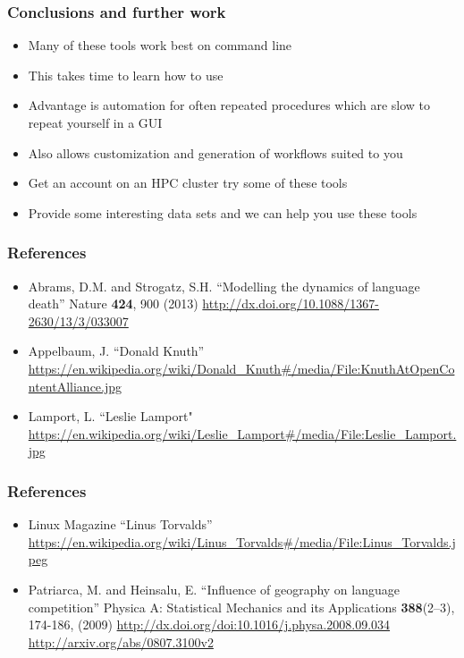 \documentclass{beamer}
\begin{document}
\begin{frame}
\frametitle{Conclusions and further work}
\begin{itemize}
\item Many of these tools work best on command line
\item This takes time to learn how to use
\item Advantage is automation for often repeated procedures which are slow to repeat yourself in a GUI
\item Also allows customization and generation of workflows suited to you
\item Get an account on an HPC cluster try some of these tools
\item Provide some interesting data sets and we can help you use these tools
\end{itemize}
\end{frame}

\begin{frame}
\frametitle{References}
\begin{itemize}
 \item Abrams, D.M. and Strogatz, S.H. ``Modelling the dynamics of language death'' Nature \textbf{424}, 900 (2013) \url{http://dx.doi.org/10.1088/1367-2630/13/3/033007}
\item Appelbaum, J. ``Donald Knuth'' \url{https://en.wikipedia.org/wiki/Donald\_Knuth\#/media/File:KnuthAtOpenContentAlliance.jpg}
\item Lamport, L. ``Leslie Lamport" \url{https://en.wikipedia.org/wiki/Leslie\_Lamport\#/media/File:Leslie\_Lamport.jpg} 
\end{itemize}
\end{frame}

\begin{frame}
\frametitle{References}
\begin{itemize}
\item Linux Magazine ``Linus Torvalds'' \url{https://en.wikipedia.org/wiki/Linus\_Torvalds\#/media/File:Linus\_Torvalds.jpeg} 
\item Patriarca, M. and Heinsalu, E. ``Influence of geography on language competition'' Physica A: Statistical Mechanics and its Applications
\textbf{388}(2--3), 174-186, (2009) \url{http://dx.doi.org/doi:10.1016/j.physa.2008.09.034} \url{http://arxiv.org/abs/0807.3100v2}
\end{itemize}
\end{frame}
\end{document}
